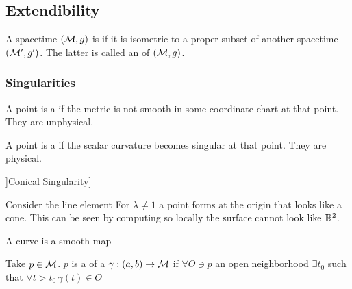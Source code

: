 \documentclass{article}
\begin{document}
\subsection{Extendibility}

\begin{definition}[Extendible]
A spacetime $(\mathcal{M},g)$ is  if it is isometric to a proper subset of another spacetime $(\mathcal{M}^\prime,g^\prime)$. The latter is called an  of $(\mathcal{M},g)$. 
\end{definition}

\subsubsection{Singularities}

\begin{definition}
A point is a  if the metric is not smooth in some coordinate chart at that point. They are unphysical.
\end{definition}

\begin{definition}
A point is a  if the scalar curvature becomes singular at that point. They are physical. 
\end{definition}

\begin{definition}]Conical Singularity]
\begin{example}
Consider the line element 
For $\lambda \neq 1$ a point forms at the origin that looks like a cone. This can be seen by computing 
so locally the surface cannot look like $\mathbb{R}^2$. 
\end{example}
\end{definition}

A curve is a smooth map 

\begin{definition}
Take $p\in\mathcal{M}$. $p$ is a  of a  $\gamma:(a,b) \to \mathcal{M}$ if $\forall O \ni p$ an open neighborhood $\exists t_0$ such that $ \forall t>t_0 \, \gamma(t)\in O$
\end{definition}
\end{document}
